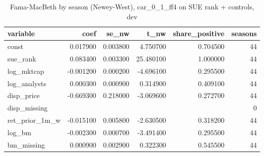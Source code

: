 \begin{table}
\caption{Fama-MacBeth by season (Newey-West), car_0_1_ff4 on SUE rank + controls, dev}
\label{tab:cd_surprise_fama_macbeth__dev}
\begin{tabular}{lrrrrr}
\toprule
variable & coef & se\_nw & t\_nw & share\_positive & seasons \\
\midrule
const & 0.017900 & 0.003800 & 4.750700 & 0.704500 & 44 \\
sue\_rank & 0.083400 & 0.003300 & 25.480100 & 1.000000 & 44 \\
log\_mktcap & -0.001200 & 0.000200 & -4.696100 & 0.295500 & 44 \\
log\_analysts & 0.000300 & 0.000900 & 0.314900 & 0.409100 & 44 \\
disp\_price & -0.669300 & 0.218000 & -3.069600 & 0.272700 & 44 \\
disp\_missing &  &  &  &  & 0 \\
ret\_prior\_1m\_w & -0.015100 & 0.005800 & -2.630500 & 0.318200 & 44 \\
log\_bm & -0.002300 & 0.000700 & -3.491400 & 0.295500 & 44 \\
bm\_missing & 0.000900 & 0.002900 & 0.322300 & 0.545500 & 44 \\
\bottomrule
\end{tabular}
\end{table}
